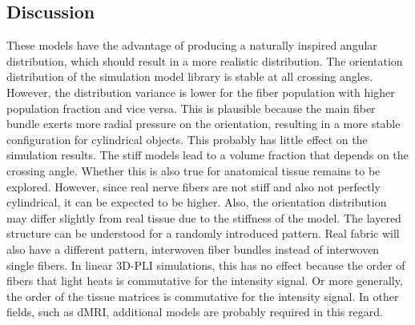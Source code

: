 \subsection{Discussion}
% 
These models have the advantage of producing a naturally inspired angular distribution, which should result in a more realistic distribution.
The orientation distribution of the simulation model library is stable at all crossing angles.
However, the distribution variance is lower for the fiber population with higher population fraction and vice versa.
This is plausible because the main fiber bundle exerts more radial pressure on the orientation, resulting in a more stable configuration for cylindrical objects.
This probably has little effect on the simulation results.
The stiff models lead to a volume fraction that depends on the crossing angle.
Whether this is also true for anatomical tissue remains to be explored.
However, since real nerve fibers are not stiff and also not perfectly cylindrical, it can be expected to be higher.
Also, the orientation distribution may differ slightly from real tissue due to the stiffness of the model.
The layered structure can be understood for a randomly introduced pattern.
Real fabric will also have a different pattern, \eg{} interwoven fiber bundles instead of interwoven single fibers.
In linear \ac{3D-PLI} simulations, this has no effect because the order of fibers that light heats is commutative for the intensity signal.
Or more generally, the order of the tissue matrices is commutative for the intensity signal.
In other fields, such as \ac{dMRI}, additional models are probably required in this regard.